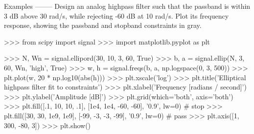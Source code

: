 \begin{DoxyVerb}
Examples
--------
Design an analog highpass filter such that the passband is within 3 dB
above 30 rad/s, while rejecting -60 dB at 10 rad/s.  Plot its
frequency response, showing the passband and stopband constraints in gray.

>>> from scipy import signal
>>> import matplotlib.pyplot as plt

>>> N, Wn = signal.ellipord(30, 10, 3, 60, True)
>>> b, a = signal.ellip(N, 3, 60, Wn, 'high', True)
>>> w, h = signal.freqs(b, a, np.logspace(0, 3, 500))
>>> plt.plot(w, 20 * np.log10(abs(h)))
>>> plt.xscale('log')
>>> plt.title('Elliptical highpass filter fit to constraints')
>>> plt.xlabel('Frequency [radians / second]')
>>> plt.ylabel('Amplitude [dB]')
>>> plt.grid(which='both', axis='both')
>>> plt.fill([.1, 10,  10,  .1], [1e4, 1e4, -60, -60], '0.9', lw=0) # stop
>>> plt.fill([30, 30, 1e9, 1e9], [-99,  -3,  -3, -99], '0.9', lw=0) # pass
>>> plt.axis([1, 300, -80, 3])
>>> plt.show()\end{DoxyVerb}
 \hypertarget{namespacescipy_1_1signal_1_1filter__design_af42fb83b1787aee4fe7e1a37547ada4d}{}
